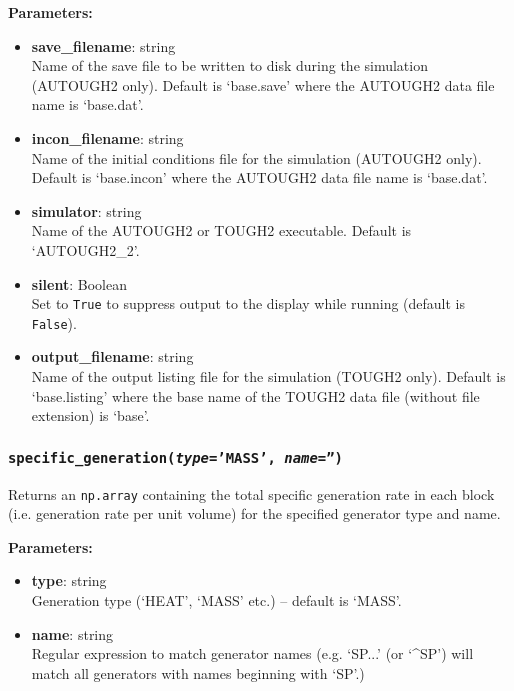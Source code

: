 \textbf{Parameters:}
\begin{itemize}
\item \textbf{save\_filename}: string\\
  Name of the save file to be written to disk during the simulation (AUTOUGH2 only).  Default is `base.save' where the AUTOUGH2 data file name is `base.dat'.
\item \textbf{incon\_filename}: string\\
  Name of the initial conditions file for the simulation (AUTOUGH2 only).  Default is `base.incon' where the AUTOUGH2 data file name is `base.dat'.
\item \textbf{simulator}: string\\
  Name of the AUTOUGH2 or TOUGH2 executable.  Default is `AUTOUGH2\_2'.
\item \textbf{silent}: Boolean\\
  Set to \texttt{True} to suppress output to the display while running (default is \texttt{False}).
\item \textbf{output\_filename}: string\\
  Name of the output listing file for the simulation (TOUGH2 only).  Default is `base.listing' where the base name of the TOUGH2 data file (without file extension) is `base'.
\end{itemize}

\begin{snugshade}
\subsubsection{\texttt{specific\_generation(\emph{type}='MASS', \emph{name}='')}}
\end{snugshade}
\label{sec:t2data:specific_generation}

Returns an \texttt{np.array} containing the total specific generation rate in each block (i.e. generation rate per unit volume) for the specified generator type and name.

\textbf{Parameters:}
\begin{itemize}
\item \textbf{type}: string\\
  Generation type (`HEAT', `MASS' etc.) -- default is `MASS'.
\item \textbf{name}: string\\
  Regular expression to match generator names (e.g. `SP...' (or `\^{}SP') will match all generators with names beginning with `SP'.)
\end{itemize}

